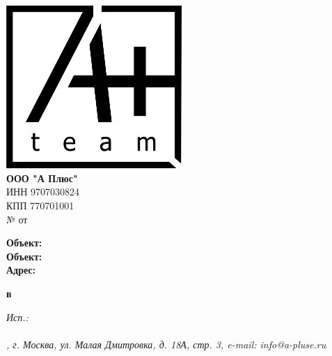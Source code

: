 \documentclass[a4paper,12pt]{letter}
\begin{document}
\noindent
\begin{minipage}[t]{0.5\textwidth}
    \vspace{0pt} %
    \includegraphics[width=0.5\textwidth]{A.png} \\ %
    \textbf{ООО "А Плюс"} \\
    ИНН 9707030824 \\
    КПП 770701001 \\
    № \textbf{  } от \textbf{  } \\
\end{minipage}%

\begin{minipage}[t]{0.5\textwidth} 
    \textbf{Объект:} \textbf{} \\
    \textbf{Объект:}  \\
    \textbf{Адрес:} 
\end{minipage}%
\begin{minipage}[t]{0.5\textwidth}
    \raggedleft
    \bfseries
    
\end{minipage}

\vspace{1cm}

\begin{center}
    \textbf{ в }
\end{center}


\vspace{0.5cm}

\begin{minipage}[t]{\textwidth}
    \raggedright
    

\end{minipage}

\vspace{1cm}


\begin{minipage}[t]{0.4\textwidth}
    \textbf{  }
\end{minipage}%
\begin{minipage}[t]{0.2\textwidth}
    \centering
    \underline{\hspace{5cm}}
\end{minipage}%
\begin{minipage}[t]{0.4\textwidth}
    \raggedleft
    \textbf{  }
\end{minipage}


\vfill

\noindent
\itshape
Исп.:  \\
 \\


\noindent\makebox[\linewidth]{\rule{1\paperwidth}{0.4pt}}
\noindent
\centering
\fontsize{9}{10}, г. Москва, ул. Малая Дмитровка, д. 18А, стр. 3, e-mail: info@a-pluse.ru
\end{document}
